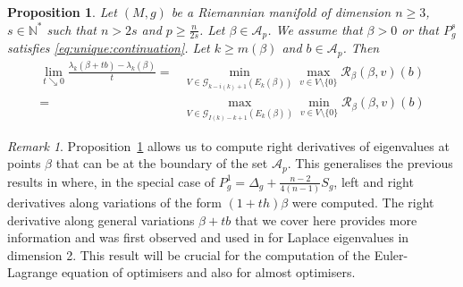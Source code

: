 \documentclass[10pt]{amsart}
\numberwithin{equation}{section}
\newcommand{\N}{\mathbb{N}}
\theoremstyle{plain}
\newtheorem{prop}[theo]{Proposition}%
\theoremstyle{remark}
\newtheorem{rem}{Remark}[section]
\begin{document}
\begin{prop} \label{prop:firstderivative}
Let $(M,g)$ be a Riemannian manifold of dimension $n\geq 3$, $s \in  \N^*$ such that $n>2s$ and $p\geq \frac{n}{2s}$. Let $\beta \in \mathcal{A}_p$. We assume that $\beta>0$ or that $P_g^s$ satisfies \eqref{eq:unique:continuation}. Let $k \ge m(\beta)$ and $b\in \mathcal{A}_p$. Then
\begin{equation} \label{eq:firstderivativeminmax}
\begin{split} \lim_{t \searrow 0 } \frac{\lambda_k(\beta+tb) - \lambda_k(\beta)}{t} = & \min_{ V \in \mathcal{G}_{k-i(k)+1}(E_k(\beta)) } \max_{v \in V\setminus \{0\}} \mathcal{R}_\beta(\beta,v)(b) \\ 
= & \max_{ V \in \mathcal{G}_{I(k)-k+1}(E_k(\beta)) } \min_{v \in V\setminus \{0\}} \mathcal{R}_\beta(\beta,v)(b)
\end{split}
\end{equation}
\end{prop}

\begin{rem}
Proposition~\ref{prop:firstderivative} allows us to compute right derivatives of eigenvalues at points $\beta$ that can be at the boundary of the set $\mathcal{A}_p$. This generalises the previous results in \cite{AmmannHumbert, GurskyPerez} where, in the special case of $P_g^1 =\Delta_g + \frac{n-2}{4(n-1)} S_g$,  left and right derivatives along variations of the form $(1+th)\beta$  were computed. The right derivative along general variations $\beta +tb$ that we cover here provides more information and was first observed and used in \cite{Petrides2,Petrides5, Petrides4} for Laplace eigenvalues in dimension 2. This result will be crucial for the computation of the Euler-Lagrange equation of optimisers and also for almost optimisers.
\end{rem}
\end{document}
